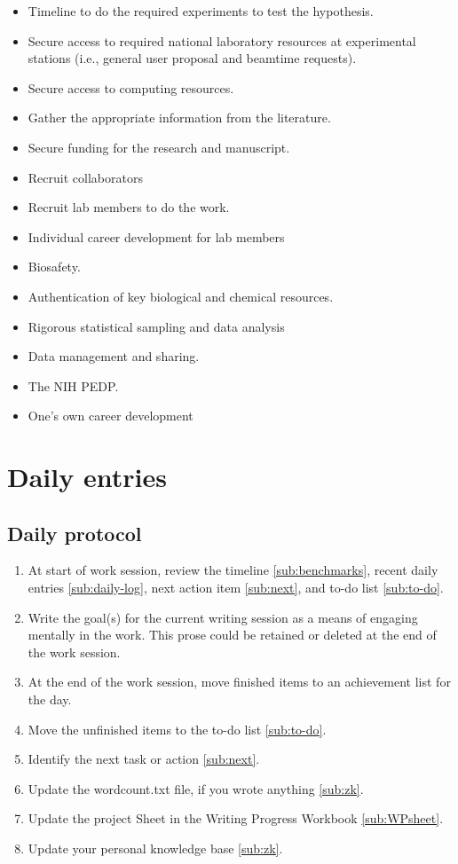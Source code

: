 \documentclass[10pt,letterpaper]{article}
\newcommand{\be}{\begin{enumerate}}
\newcommand{\ee}{\end{enumerate}}
\begin{document}
\begin{itemize}
   \item Timeline to do the required experiments to test the hypothesis. 
   \item Secure access to required national laboratory resources at experimental stations (i.e., general user proposal and beamtime requests).
  \item Secure access to computing resources.
  \item Gather the appropriate information from the literature.
  \item Secure funding for the research and manuscript.
  \item Recruit collaborators
  \item Recruit lab members to do the work.
  \item Individual career development for lab members
  \item Biosafety.
  \item Authentication of key biological and chemical resources.
  \item Rigorous statistical sampling and data analysis
  \item Data management and sharing.
  \item The NIH PEDP.
  \item One's own career development
\end{itemize}


\section{Daily entries}
\label{sec:dailyEntries}

\subsection{Daily protocol}
\label{sub:entry-protocol}

\be
\item At start of work session, review the timeline \ref{sub:benchmarks}, recent daily entries \ref{sub:daily-log}, next action item \ref{sub:next}, and to-do list \ref{sub:to-do}.
\item Write the goal(s) for the current writing session as a means of engaging mentally in the work. This prose could be retained or deleted at the end of the work session.
\item At the end of the work session, move finished items to an achievement list for the day.
\item Move the unfinished items to the to-do list \ref{sub:to-do}.
\item Identify the next task or action \ref{sub:next}.
\item Update the wordcount.txt file, if you wrote anything \ref{sub:zk}.
\item Update the project Sheet in the Writing Progress Workbook \ref{sub:WPsheet}.
\item Update your personal knowledge base \ref{sub:zk}.
\ee
\end{document}
